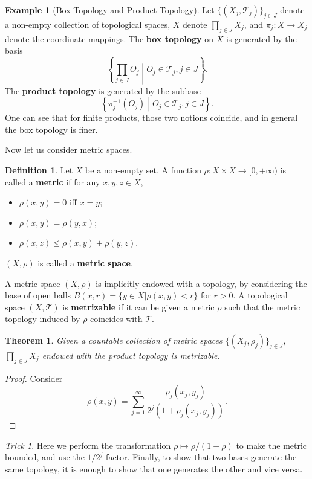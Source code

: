 \documentclass[openany]{book}
\newtheorem{theorem}{Theorem}[chapter]
\theoremstyle{definition}
\newtheorem{definition}{Definition}[chapter]
\newtheorem{example}{Example}[chapter]
\theoremstyle{remark}
\newtheorem*{trick}{Trick}
\begin{document}
\begin{example}[Box Topology and Product Topology]
    Let $\{(X_j,\mathcal{T}_j)\}_{j\in J}$ denote a non-empty collection of topological spaces, $X$ denote $\prod_{j\in J}X_j$, and $\pi_j:X\to X_j$ denote the coordinate mappings. The \textbf{box topology} on $X$ is generated by the basis
    \begin{equation*}
        \left\{\prod_{j\in J}O_j\middle|O_j\in \mathcal{T}_j,j\in J\right\}.
    \end{equation*}
    The \textbf{product topology} is generated by the subbase
    \begin{equation*}
        \left\{\pi_j^{-1}(O_j)\middle|O_j\in \mathcal{T}_j,j\in J\right\}.
    \end{equation*}
    One can see that for finite products, those two notions coincide, and in general the box topology is finer.
\end{example}

Now let us consider metric spaces.
\begin{definition}
    Let $X$ be a non-empty set. A function $\rho:X\times X\to[0,+\infty)$ is called a \textbf{metric} if for any $x,y,z\in X$,
    \begin{itemize}
        \item $\rho(x,y)=0$ iff $x=y$;
        \item $\rho(x,y)=\rho(y,x)$;
        \item $\rho(x,z)\le\rho(x,y)+\rho(y,z)$.
    \end{itemize}
    $(X,\rho)$ is called a \textbf{metric space}.
\end{definition}
A metric space $(X,\rho)$ is implicitly endowed with a topology, by considering the base of open balls $B(x,r)=\{y\in X|\rho(x,y)<r\}$ for $r>0$. A topological space $(X,\mathcal{T})$ is \textbf{metrizable} if it can be given a metric $\rho$ such that the metric topology induced by $\rho$ coincides with $\mathcal{T}$.
\begin{theorem}
    Given a countable collection of metric spaces $\{(X_j,\rho_j)\}_{j\in J}$, $\prod_{j\in J}X_j$ endowed with the product topology is metrizable.
\end{theorem}
\begin{proof}
    Consider
    \begin{equation}\label{eq:prodMetric}
        \rho(x,y)=\sum_{j=1}^{\infty}\frac{\rho_j(x_j,y_j)}{2^j(1+\rho_j(x_j,y_j))}.
    \end{equation}
\end{proof}
\begin{trick}
    Here we perform the transformation $\rho\mapsto\rho/(1+\rho)$ to make the metric bounded, and use the $1/2^j$ factor. Finally, to show that two bases generate the same topology, it is enough to show that one generates the other and vice versa.
\end{trick}
\end{document}
